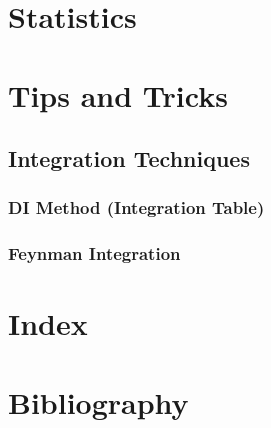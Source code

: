 \documentclass[12pt, english]{book}
\begin{document}
	\part{Statistics} \label{Statistics Part}
	\part{Tips and Tricks} \label{Tips and Tricks Part}
	
	\chapter{Integration Techniques} \label{Integration Techniques Chapter - Tips and Tricks}
	
	\section{DI Method (Integration Table)} \label{DI Method Section - Tips and Tricks}
	
	\section{Feynman Integration} \label{Feynman Integration Section - Tips and Tricks}
	
	\backmatter
	\part{Index} \label{Index Part}
	
	\part{Bibliography}
	
	\typeout{}
	
	
\end{document}
